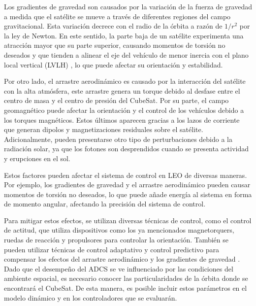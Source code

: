 Los gradientes de gravedad son causados por la variación de la fuerza de gravedad a medida que el satélite se mueve a través de diferentes regiones del campo gravitacional. Esta variación decrece con el radio de la órbita a razón de $1/r^2$ por la ley de Newton. En este sentido, la parte baja de un satélite experimenta una atracción mayor que su parte superior, causando momentos de torsión no deseados y que tienden a alinear el eje del vehículo de menor inercia con el plano local vertical (LVLH) \cite{griffin2004space}, lo que puede afectar su orientación y estabilidad.

Por otro lado, el arrastre aerodinámico es causado por la interacción del satélite con la alta atmósfera, este arrastre genera un torque debido al desfase entre el centro de masa y el centro de presión del CubeSat. Por su parte, el campo geomagnético puede afectar la orientación y el control de los vehículos debido a los torques magnéticos. Estos últimos aparecen gracias a los lazos de corriente que generan dipolos y magnetizaciones residuales sobre el satélite\cite{Giesselman2006}. Adicionalmente, pueden presentarse otro tipo de perturbaciones debido a la radiación solar, ya que los fotones son desprendidos cuando se presenta actividad y erupciones en el sol.

Estos factores pueden afectar el sistema de control en LEO de diversas maneras. Por ejemplo, los gradientes de gravedad y el arrastre aerodinámico pueden causar momentos de torsión no deseados, lo que puede añade energía al sistema en forma de momento angular, afectando la precisión del sistema de control.
 
Para mitigar estos efectos, se utilizan diversas técnicas de control, como el control de actitud, que utiliza dispositivos como los ya mencionados magnetorquers, ruedas de reacción y propulsores para controlar la orientación. También se pueden utilizar técnicas de control adaptativo y control predictivo para compensar los efectos del arrastre aerodinámico y los gradientes de gravedad \cite{Junkins1997}.
Dado que el desempeño del ADCS se ve influenciado por las condiciones del ambiente espacial, es necesario conocer las particularidades de la órbita donde se encontrará el CubeSat. De esta manera, es posible incluir estos parámetros en el modelo dinámico y en los controladores que se evaluarán. 


